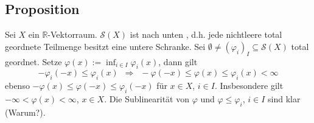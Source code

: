 \subsection[Proposition: Die sublinearen Abbildungen $\mathcal{S}(X)$ sind nach unten induktiv geordnet]{Proposition} %
\label{sub:219}
Sei $X$ ein $\mathds{R}$-Vektorraum. $\mathcal{S}(X)$ ist nach unten , d.h. jede nichtleere total geordnete Teilmenge besitzt eine untere Schranke.
Sei $\emptyset \not= (\varphi_i)_{I} \subseteq \mathcal{S}(X)$ total geordnet. Setze $\varphi(x) := \inf_{i \in I} \varphi_i(x)$, dann gilt 
\[
	- \varphi_i(-x) \le \varphi_i(x) \enspace\Longrightarrow \enspace- \varphi(-x) \le \varphi(x) \le \varphi_i(x) < \infty
\]
ebenso $-\varphi(x) \le \varphi(-x) \le \varphi_i(-x)$ für $x \in X$, $i \in I$. Insbesondere gilt $- \infty <  \varphi(x) < \infty$, $x \in X$. 
Die Sublinearität von $\varphi$ und $\varphi \le \varphi_i$, $i \in I$ sind klar (Warum?). \bewende

